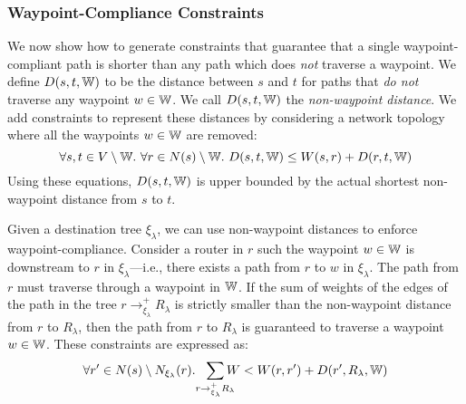 \subsubsection{Waypoint-Compliance Constraints} \hspace*{4mm}


\label{sec:waypoint-compliance-constraints}
We now show how to generate constraints that
guarantee that a single waypoint-compliant path is shorter
than any path which does \emph{not} traverse a waypoint. 
We define $D(s,t,\mathbb{W})$ to be the 
distance between $s$ and $t$ for paths that \emph{do not}
 traverse any waypoint $w \in \mathbb{W}$.
We call  $D(s,t,\mathbb{W})$ the \emph{non-waypoint distance}.
  We add constraints to represent these distances by
  considering a network topology where all the  
  waypoints $w \in \mathbb{W}$ are removed:
\begin{equation} \label{eq:wdistance}
\forall s, t \in V \setminus \mathbb{W}. ~\forall r \in N(s) \setminus \mathbb{W}.~
D(s, t, \mathbb{W}) \leq W(s, r) + D(r,t,\mathbb{W})
\end{equation}
Using these equations,
$D(s,t,\mathbb{W})$ is upper bounded by the actual shortest non-waypoint distance from $s$ to $t$.


Given a destination tree $\xi_\lambda$, we can use
non-waypoint distances to enforce waypoint-compliance. Consider a 
router in $r$ such the waypoint $w \in \mathbb{W}$ is downstream to $r$ in $\xi_\lambda$---i.e.,
there exists a path from $r$ to $w$ in $\xi_\lambda$.
The path from $r$ must traverse through 
a waypoint in $\mathbb{W}$.  
If the sum of weights of the edges of
the path in the tree $r \rightarrow^+_{\xi_\lambda} R_\lambda$  
is strictly smaller than the non-waypoint 
distance from $r$ to $R_\lambda$, 
then the path from $r$ to $R_\lambda$ is guaranteed to traverse
a waypoint $w \in \mathbb{W}$. These constraints are expressed as:
\begin{equation} \label{eq:waypoint}
\forall r' \in N(s) \setminus N_{\xi_\lambda}(r).~~ \sum_{\mathclap{\substack{r \rightarrow^+_{\xi_\lambda} R_\lambda}}} 
W < 
W(r, r')+ D(r', R_\lambda, \waypt) 
\end{equation}

